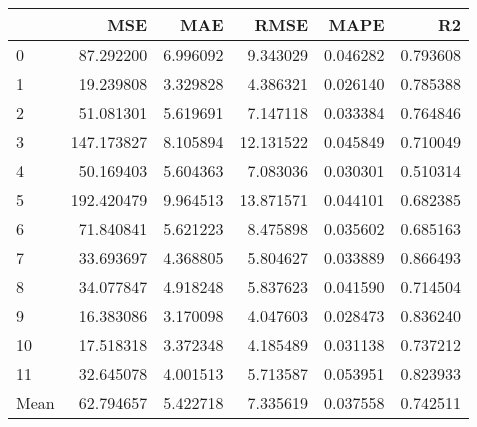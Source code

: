 \begin{tabular}{lrrrrr}
\toprule
 & MSE & MAE & RMSE & MAPE & R2 \\
\midrule
0 & 87.292200 & 6.996092 & 9.343029 & 0.046282 & 0.793608 \\
1 & 19.239808 & 3.329828 & 4.386321 & 0.026140 & 0.785388 \\
2 & 51.081301 & 5.619691 & 7.147118 & 0.033384 & 0.764846 \\
3 & 147.173827 & 8.105894 & 12.131522 & 0.045849 & 0.710049 \\
4 & 50.169403 & 5.604363 & 7.083036 & 0.030301 & 0.510314 \\
5 & 192.420479 & 9.964513 & 13.871571 & 0.044101 & 0.682385 \\
6 & 71.840841 & 5.621223 & 8.475898 & 0.035602 & 0.685163 \\
7 & 33.693697 & 4.368805 & 5.804627 & 0.033889 & 0.866493 \\
8 & 34.077847 & 4.918248 & 5.837623 & 0.041590 & 0.714504 \\
9 & 16.383086 & 3.170098 & 4.047603 & 0.028473 & 0.836240 \\
10 & 17.518318 & 3.372348 & 4.185489 & 0.031138 & 0.737212 \\
11 & 32.645078 & 4.001513 & 5.713587 & 0.053951 & 0.823933 \\
Mean & 62.794657 & 5.422718 & 7.335619 & 0.037558 & 0.742511 \\
\bottomrule
\end{tabular}
